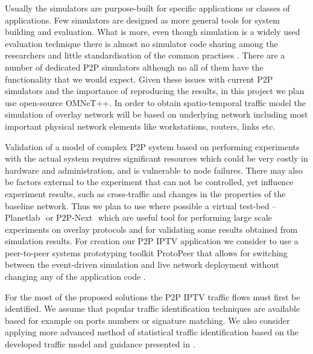 \documentclass[10pt, conference, compsocconf]{IEEEtran}
\begin{document}
Usually the simulators are purpose-built for specific applications or classes of applications. Few simulators are designed as more general tools for system building and evaluation. What is more, even though simulation is a widely used evaluation technique there is almost no simulator code sharing among the researchers and little standardisation of the common practises \cite{naicken_survey_2006-1}. There are a number of dedicated P2P simulators although no all of them have the functionality that we would expect. Given these issues with current P2P simulators and the importance of reproducing the results, in this project we plan use open-source OMNeT++. In order to obtain spatio-temporal traffic model the simulation of overlay network will be based on underlying network including most important physical network elements like workstations, routers, links etc. 

Validation of a model of complex P2P system based on performing experiments with the actual system requires significant resources which could be very costly in hardware and administration, and is vulnerable to node failures. There may also be factors external to the experiment that can not be controlled, yet influence experiment results, such as cross-traffic and changes in the properties of the baseline network. Thus we plan to use where possible a virtual test-bed -- Planetlab \cite{chun_planetlab:overlay_2003}⁠ or P2P-Next \cite{jimenez_p2p-next:_2009}⁠ which are useful tool for performing large scale experiments on overlay protocols and for validating some results obtained from simulation results. For creation our P2P IPTV application we consider to use a peer-to-peer systems prototyping toolkit ProtoPeer that allows for switching between the event-driven simulation and live network deployment without changing any of the application code ⁠\cite{galuba_protopeer:simulation_2008}.

For the most of the proposed solutions the P2P IPTV traffic flows must first be identified. We assume that popular traffic identification techniques are available based for example on ports numbers or signature matching. We also consider applying more advanced method of statistical traffic identification based on the developed traffic model and guidance presented in \cite{kim_internet_2008}⁠. 
\end{document}
